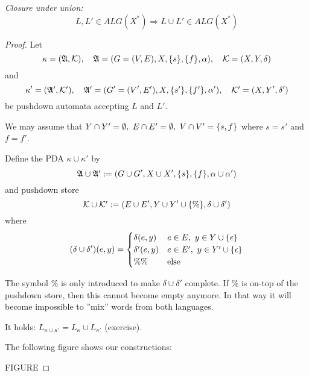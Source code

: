 {\em Closure under union:}
\[ L,L' \in ALG(X^*) \Rightarrow L \cup L' \in ALG(X^*) \]
\begin{proof}
Let
\[ \kappa = (\mbox{$\mathfrak{A}$},\mbox{$\mathcal{K}$}),\quad \mbox{$\mathfrak{A}$} = (G = (V, E), X, \mbox{$\{s\}$},
\mbox{$\{f\}$}, \alpha),\quad \mbox{$\mathcal{K}$} = (X, Y, \delta)
\]
and
\[ \kappa' = (\mbox{$\mathfrak{A'}$}, \mbox{$\mathcal{K'}$}), \quad \mbox{$\mathfrak{A'}$} = (G' = (V', E'), X,
\mbox{$\{s'\}$}, \mbox{$\{f'\}$}, \alpha'),\quad \mbox{$\mathcal{K'}$} = (X, Y', \delta')
\]
be pushdown automata accepting $L$ and $L'$.

We may assume that $Y \cap Y' = \emptyset,\ E \cap E' =
\emptyset,\ V \cap V' = \mbox{$\{s, f\}$}$ where $s = s'$ and $f = f'$.

Define the PDA $\kappa \cup \kappa'$ by
\[ \mbox{$\mathfrak{A}$} \cup \mbox{$\mathfrak{A'}$} := (G \cup G', X \cup X', \mbox{$\{s\}$}, \mbox{$\{f\}$}, \alpha
\cup \alpha')
\]
and pushdown store
\[ \mbox{$\mathcal{K}$} \cup \mbox{$\mathcal{K'}$} := (E \cup E', Y \cup Y' \cup
\mbox{$\{\%\}$}, \delta \cup \delta')
\]
where
\[ (\delta \cup \delta')(e, y) = \begin{cases}
\delta(e, y) & e \in E,\ y \in Y \cup \mbox{$\{\epsilon\}$} \\ 
\delta'(e, y) & e \in E',\ y \in Y' \cup \mbox{$\{\epsilon\}$} \\
\%\% & \text{else} 
\end{cases}
\]

The symbol $\%$ is only introduced to make $\delta \cup \delta'$
complete. If $\%$ is on-top of the pushdown store, then this cannot become
empty anymore. In that way it will become impossible to ''mix'' words from both
languages.

It holds: $L_{\kappa \cup \kappa'} = L_{\kappa} \cup L_{\kappa'}$ (exercise).

The following figure shows our constructions:

FIGURE

\end{proof}

